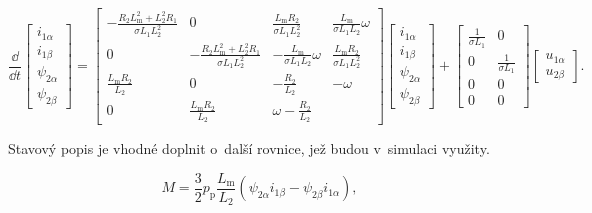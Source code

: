 \documentclass[a4paper, twoside, 11pt]{article}
\begin{document}
\begin{equation}\label{eq:state-equations-asm-model-lipcak}
    \frac{\dd{}}{\dd{t}}
    \begin{bmatrix}
        i_{1\alpha}\\
        i_{1\beta}\\
        \psi_{2\alpha}\\
        \psi_{2\beta}
    \end{bmatrix}
    =
    \begin{bmatrix}
        -\frac{R_2 L_\text{m}^{2} + L_2^2 R_1}{\sigma L_1 L_2^2} & 0 & \frac{L_\text{m} R_2}{\sigma L_1 L_2^2} & \frac{L_\text{m}}{\sigma L_1 L_2} \omega\\
        0 & - \frac{R_2 L_\text{m}^2 + L_2^2 R_1}{\sigma L_1 L_2^2} & - \frac{L_\text{m}}{\sigma L_1 L_2} \omega & \frac{L_\text{m} R_2}{\sigma L_1 L_2^2}\\
        \frac{L_\text{m} R_2}{L_2} & 0 & - \frac{R_2}{L_2} & -\omega\\
        0 & \frac{L_\text{m} R_2}{L_2} & \omega -\frac{R_2}{L_2}
    \end{bmatrix}
    \begin{bmatrix}
        i_{1\alpha}\\
        i_{1\beta}\\
        \psi_{2\alpha}\\
        \psi_{2\beta}
    \end{bmatrix}
    +
    \begin{bmatrix}
        \frac{1}{\sigma L_1} & 0\\
        0 & \frac{1}{\sigma L_1}\\
        0 & 0\\
        0 & 0
    \end{bmatrix}
    \begin{bmatrix}
        u_{1\alpha}\\
        u_{2\beta}
    \end{bmatrix}.
\end{equation}

Stavový popis je vhodné doplnit o~další rovnice, jež budou v~simulaci využity.

\begin{equation}
    M = \frac{3}{2} p_\text{p} \frac{L_\text{m}}{L_2} (\psi_{2\alpha} i_{1\beta} - \psi_{2\beta} i_{1\alpha}),
\end{equation}
\end{document}
